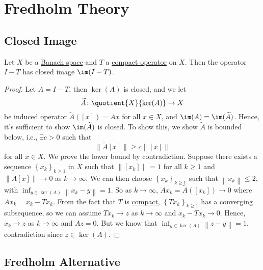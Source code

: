 \section{Fredholm Theory}
\subsection{Closed Image}
\begin{lemma}\label{lma:lec19}
	Let \(X\) be a \hyperref[def:Banach-space]{Banach space} and \(T\) a \hyperref[def:compact-op]{compact operator} on \(X\). Then the operator \(I-T\) has closed image \(\im(I-T)\).
\end{lemma}
\begin{proof}
	Let \(A=I-T\), then \(\ker (A)\) is closed, and we let
	\[
		\widetilde{A} \colon \quotient{X}{\ker(A)}\to X
	\]
	be induced operator \(\widetilde{A} ([x])=Ax\) for all \(x\in X\), and \(\im(A) = \im(\widetilde{A} )\). Hence, it's sufficient to show \(\im(\widetilde{A} )\) is closed. To show this, we show \(\widetilde{A} \) is bounded below, i.e., \(\exists c>0\) such that
	\[
		\lVert \widetilde{A} [x]\rVert \geq c\left\lVert [x]\right\rVert
	\]
	for all \(x\in X\). We prove the lower bound by contradiction. Suppose there exists a sequence \(\left\{ x_k \right\} _{k\geq 1}\) in \(X\) such that \(\left\lVert [x_{k} ]\right\rVert = 1\) for all \(k\geq 1\) and \(\lVert \widetilde{A} [x] \rVert \to 0\) as \(k \to \infty \). We can then choose \(\left\{ x_{k}  \right\}_{k\geq 1} \) such that \(\left\lVert x_{k} \right\rVert \leq 2\), with \(\inf_{y\in \ker(A)} \left\lVert x_{k} -y\right\rVert=1 \). So as \(k\to \infty \), \(Ax_{k} = \widetilde{A} ([x_{k} ])\to 0\) where \(Ax_{k} = x_{k} - Tx_{k} \). From the fact that \(T\) is \hyperref[def:compact-op]{compact}, \(\left\{ Tx_{k}  \right\}_{k\geq 1} \) has a converging subsequence, so we can assume \(Tx_{k} \to z\) as \(k\to \infty \) and \(x_{k} - Tx_{k} \to 0\). Hence, \(x_{k} \to z\) as \(k\to  \infty \) and \(Az = 0\). But we know that \(\inf _{y\in \ker(A)} \left\lVert z - y\right\rVert = 1\), contradiction since \(z\in \ker(A)\).
\end{proof}

\subsection{Fredholm Alternative}

